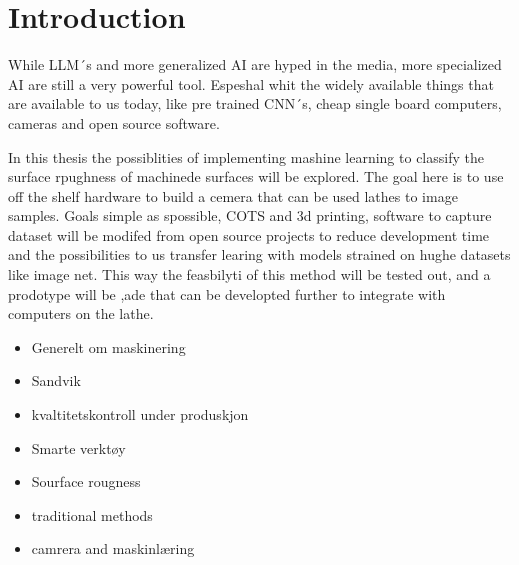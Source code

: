 \chapter{Introduction}

While LLM´s and more generalized AI are hyped in the media, more specialized AI are still a very powerful tool. Espeshal whit the widely available things that are available to us today, like pre trained CNN´s, cheap single board computers, cameras and open source software.

In this thesis the possiblities of implementing mashine learning to classify the surface rpughness of machinede surfaces will be explored. The goal here is to use off the shelf hardware to build a cemera that can be used lathes to image samples. Goals simple as spossible, COTS and 3d printing, software to capture dataset will be modifed from open source projects to reduce development time and the possibilities to us transfer learing with models strained on hughe datasets like image net. This way the feasbilyti of this method will be tested out, and a prodotype will be ,ade that can be developted further to integrate with computers on the lathe.

\begin{itemize}
    \item Generelt om maskinering
    \item Sandvik
    \item kvaltitetskontroll under produskjon
    \item Smarte verktøy
    \item Sourface rougness
    \item traditional methods
    \item camrera and maskinlæring
\end{itemize}

